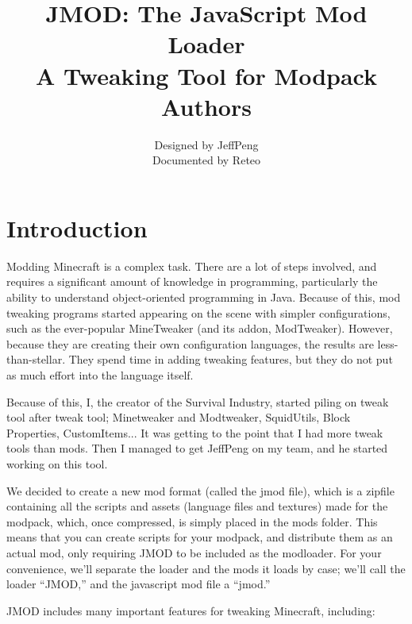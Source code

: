 \documentclass[letterpaper,titlepage,12pt]{article}
\title{JMOD: The JavaScript Mod Loader\\{\small A Tweaking Tool for Modpack Authors}}
\author{Designed by JeffPeng\\Documented by Reteo}
\begin{document}
\maketitle

\tableofcontents

\newpage

\section*{Introduction}

Modding Minecraft is a complex task.  There are a lot of steps involved, and requires a significant amount of knowledge in programming, particularly the ability to understand object-oriented programming in Java.  Because of this, mod tweaking programs started appearing on the scene with simpler configurations, such as the ever-popular MineTweaker (and its addon, ModTweaker).  However, because they are creating their own configuration languages, the results are less-than-stellar.  They spend time in adding tweaking features, but they do not put as much effort into the language itself.

Because of this, I, the creator of the Survival Industry, started piling on tweak tool after tweak tool; Minetweaker and Modtweaker, SquidUtils, Block Properties, CustomItems... It was getting to the point that I had more tweak tools than mods.  Then I managed to get JeffPeng on my team, and he started working on this tool.

We decided to create a new mod format (called the jmod file), which is a zipfile containing all the scripts and assets (language files and textures) made for the modpack, which, once compressed, is simply placed in the mods folder.  This means that you can create scripts for your modpack, and distribute them as an actual mod, only requiring JMOD to be included as the modloader.  For your convenience, we'll separate the loader and the mods it loads by case; we'll call the loader ``JMOD,'' and the javascript mod file a ``jmod.''

JMOD includes many important features for tweaking Minecraft, including:
\end{document}
